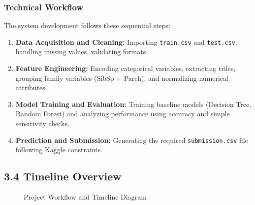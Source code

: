 \documentclass[12pt]{report}
\begin{document}
\subsubsection*{Technical Workflow}

The system development follows these sequential steps:

\begin{enumerate}
    \item \textbf{Data Acquisition and Cleaning:}  
    Importing \texttt{train.csv} and \texttt{test.csv}, handling missing values, validating formats.
    
    \item \textbf{Feature Engineering:}  
    Encoding categorical variables, extracting titles, grouping family variables (SibSp + Parch), and normalizing numerical attributes.
    
    \item \textbf{Model Training and Evaluation:}  
    Training baseline models (Decision Tree, Random Forest) and analyzing performance using accuracy and simple sensitivity checks.
    
    \item \textbf{Prediction and Submission:}  
    Generating the required \texttt{submission.csv} file following Kaggle constraints.
\end{enumerate}

\subsection*{3.4 Timeline Overview}

\begin{figure}[h!]
\centering


\caption{Project Workflow and Timeline Diagram}
\end{figure}
\end{document}
